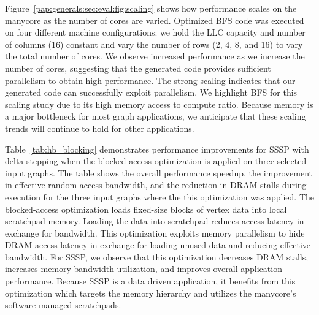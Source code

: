 \hbBlockingEvalTab

Figure~\ref{pap:generals:sec:eval:fig:scaling} shows how performance scales on the \hb manycore as the number of cores are varied.
Optimized BFS code was executed on four different machine configurations: we hold the LLC capacity and number of columns (16) constant
and vary the number of rows (2, 4, 8, and 16) to vary the total number of cores.
We observe increased performance as we increase the number of cores, suggesting that the generated code provides sufficient parallelism to obtain high performance.
The strong scaling indicates that our generated code can successfully exploit parallelism.
We highlight BFS for this scaling study due to its high memory access to compute ratio.
Because memory is a major bottleneck for most graph applications, we anticipate that these scaling trends will continue to hold for other applications. 

Table~\ref{tab:hb_blocking} demonstrates performance improvements for SSSP with delta-stepping when the blocked-access optimization is applied on three selected input graphs.
The table shows the overall performance speedup, the improvement in effective random access bandwidth, and the reduction in DRAM stalls during execution for the three input graphs where the this optimization was applied.
The blocked-access optimization loads fixed-size blocks of vertex data into local scratchpad memory.
Loading the data into scratchpad reduces access latency in exchange for bandwidth.
This optimization exploits memory parallelism to hide DRAM access latency in exchange for loading unused data and reducing effective bandwidth.
For SSSP, we observe that this optimization decreases DRAM stalls, increases memory bandwidth utilization, and improves overall application performance.
Because SSSP is a data driven application, it benefits from this optimization which targets the memory hierarchy and utilizes the manycore's software managed scratchpads.

